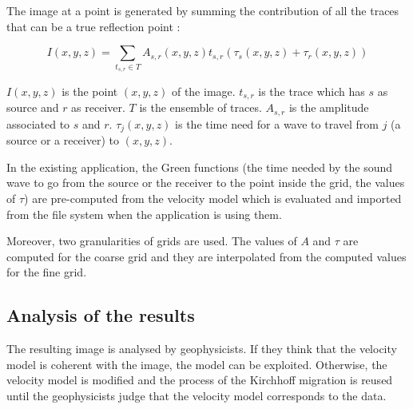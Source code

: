 The image at a point is generated by summing the contribution of all the traces that can be a true reflection point :


\begin{equation}
	I(x,y,z)=\sum_{t_{s,r} \in T}A_{s,r}(x,y,z)t_{s,r}(\tau_s(x,y,z) + \tau_r(x,y,z))
\end{equation}

$I(x,y,z)$ is the point $(x,y,z)$ of the image.
$t_{s,r}$ is the trace which has $s$ as source and $r$ as receiver.
$T$ is the ensemble of traces.
$A_{s,r}$ is the amplitude associated to $s$ and $r$.
$\tau_j(x,y,z)$  is the time need for a wave to travel from $j$ (a source or a receiver) to $(x,y,z)$.


In the existing application, the Green functions (the time needed by the sound wave to go from the source or the receiver to the point inside the grid, the values of $\tau$) are pre-computed from the velocity model which is evaluated and imported from the file system when the application is using them.

Moreover, two granularities of grids are used.
The values of $A$ and $\tau$ are computed for the coarse grid and they are interpolated from the computed values for the fine grid.


\subsection{Analysis of the results}
The resulting image is analysed by geophysicists.
If they think that the velocity model is coherent with the image, the model can be exploited.
Otherwise, the velocity model is modified and the process of the Kirchhoff migration is reused until the geophysicists judge that the velocity model corresponds to the data.